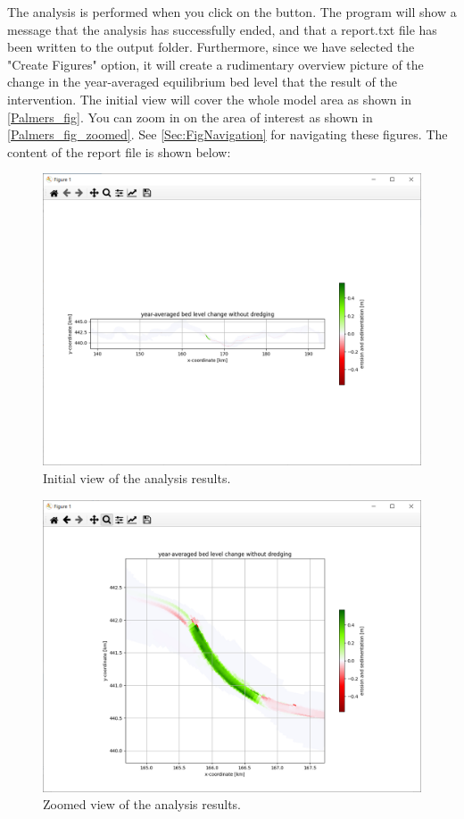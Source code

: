
The \dfmi analysis is performed when you click on the  button.
The program will show a message that the analysis has successfully ended, and that a report.txt file has been written to the output folder.
Furthermore, since we have selected the "Create Figures" option, it will create a rudimentary overview picture of the change in the year-averaged equilibrium bed level that the result of the intervention.
The initial view will cover the whole model area as shown in \autoref{Palmers_fig}.
You can zoom in on the area of interest as shown in \autoref{Palmers_fig_zoomed}.
See \autoref{Sec:FigNavigation} for navigating these figures.
The content of the report file is shown below:

\begin{figure}
\center
\includegraphics[width=\textwidth]{figures/Palmerswaard_fig.png}
\caption{Initial view of the analysis results.}
\label{Palmers_fig}
\end{figure}

\begin{figure}
\center
\includegraphics[width=\textwidth]{figures/Palmerswaard_fig_zoomed.png}
\caption{Zoomed view of the analysis results.}
\label{Palmers_fig_zoomed}
\end{figure}

